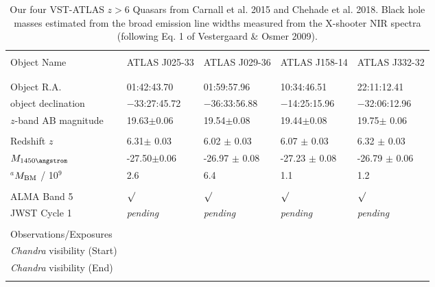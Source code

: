 \begin{table}[h]
\begin{center}
\begin{tabular}{||  l|l|l|l|l ||}
  \hline\hline
  &&&& \\
  Object Name         &  ATLAS J025-33        &   ATLAS J029-36          &  ATLAS J158-14   & ATLAS J332-32     \\
  &&&& \\
  \hline
  &&&& \\
  Object R.A.                                 & 01:42:43.70          & 01:59:57.96           & 10:34:46.51         & 22:11:12.41     \\
  object declination                      & $-$33:27:45.72     & $-$36:33:56.88    & $-$14:25:15.96      & $-$32:06:12.96  \\
  $z$-band AB magnitude            & 19.63$\pm$0.06   & 19.54$\pm$0.08   & 19.44$\pm$0.08   & 19.75$\pm$ 0.06  \\  
  &&&& \\
  Redshift $z$                               & 6.31$\pm$ 0.03   &  6.02 $\pm$  0.03   &  6.07 $\pm$  0.03     &  6.32 $\pm$  0.03   \\  
  $M_{1450 \angstrom} $                    & -27.50$\pm$0.06&  -26.97 $\pm$ 0.08&  -27.23 $\pm$ 0.08& -26.79 $\pm$ 0.06 \\
  $^{a}$$M_{\rm BM}$ / 10$^{9}$      & 2.6       &   6.4 & 1.1 &1.2 \\ 
  &&&& \\
  ALMA  Band 5                      &   $\surd$                     & $\surd$                & $\surd$                  & $\surd$  \\
  JWST Cycle 1                         & {\it pending}      & {\it pending}   & {\it pending}   & {\it pending} \\
 &&&& \\
Observations/Exposures                 &                           &   &           &          \\
{\it Chandra} visibility (Start) &       &    &    &   \\ 
{\it Chandra}  visibility (End)  &      &     &   &   \\ 
 &&&& \\
\hline\hline
      \end{tabular}
\caption{
Our four VST-ATLAS $z>6$ Quasars from Carnall et al. 2015 and Chehade
et al. 2018.  Black hole masses estimated from the \mgii broad
emission line widths measured from the X-shooter NIR spectra
(following Eq. 1 of Vestergaard \& Osmer 2009).
}
\label{tab:targets} 
  \end{center}
\end{table}
